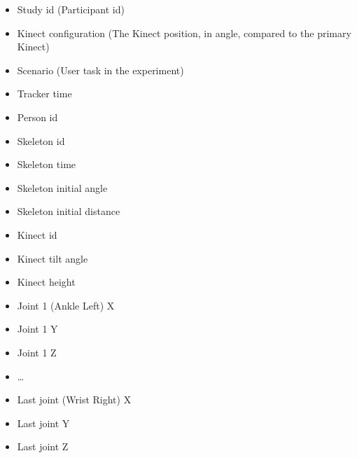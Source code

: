 \begin{appendices}
\begin{itemize}
  \item Study id (Participant id)
  \item Kinect configuration (The Kinect position, in angle, compared to the primary Kinect)
  \item Scenario (User task in the experiment)
  \item Tracker time
  \item Person id
  \item Skeleton id
  \item Skeleton time
  \item Skeleton initial angle
  \item Skeleton initial distance
  \item Kinect id
  \item Kinect tilt angle
  \item Kinect height
  \item Joint 1 (Ankle Left) X
  \item Joint 1 Y
  \item Joint 1 Z
  \item \ldots
  \item Last joint (Wrist Right) X
  \item Last joint Y 
  \item Last joint Z
\end{itemize}

\end{appendices}
